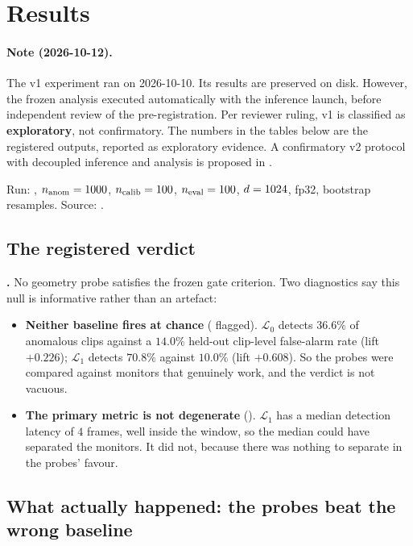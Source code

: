 \section{Results}
\label{sec:results}

\paragraph{Note (2026-10-12).}
The v1 experiment ran on 2026-10-10. Its results are preserved on disk.
However, the frozen analysis executed automatically with the inference launch,
before independent review of the pre-registration. Per reviewer ruling, v1 is
classified as \textbf{exploratory}, not confirmatory. The numbers in the tables
below are the registered outputs, reported as exploratory evidence. A
confirmatory v2 protocol with decoupled inference and analysis is proposed in
.

Run: \lgwModel, $n_{\text{anom}} = 1000$, $n_{\text{calib}} = 100$,
$n_{\text{eval}} = 100$, $d = 1024$, fp32, \lgwNBoot{} bootstrap
resamples. Source: \lgwSource.

\subsection{The registered verdict}

\textbf{\lgwVerdict.} No geometry probe satisfies the frozen gate criterion.
Two diagnostics say this null is informative rather than an artefact:

\begin{itemize}
\item \textbf{Neither baseline fires at chance} (\lgwBaselinesAtChance{} flagged).
$\mathcal{L}_0$ detects $36.6\%$ of anomalous clips against a $14.0\%$ held-out
clip-level false-alarm rate (lift $+0.226$); $\mathcal{L}_1$ detects $70.8\%$
against $10.0\%$ (lift $+0.608$). So the probes were compared against monitors
that genuinely work, and the verdict is not vacuous.
\item \textbf{The primary metric is not degenerate} (\lgwMedianDegenerate).
$\mathcal{L}_1$ has a median detection latency of $4$ frames, well inside the
window, so the median could have separated the monitors. It did not, because
there was nothing to separate in the probes' favour.
\end{itemize}



\subsection{What actually happened: the probes beat the wrong baseline}

